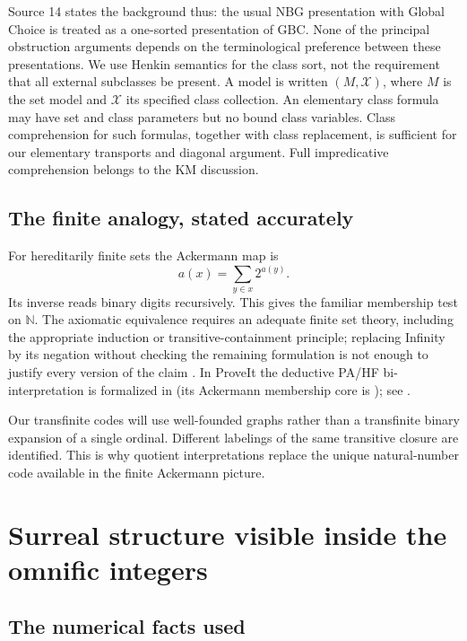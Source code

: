 \documentclass[11pt,letterpaper]{article}
\theoremstyle{definition}
\theoremstyle{remark}
\newcommand{\N}{\mathbb N}
\newcommand{\GBC}{\mathrm{GBC}}
\begin{document}
Source 14 states the background thus: the usual NBG presentation with Global
Choice is treated as a one-sorted presentation of $\GBC$. None of the principal
obstruction arguments depends on the terminological preference between these
presentations. We use Henkin semantics for the class sort, not the requirement
that all external subclasses be present. A model is written $(M,\mathcal X)$,
where $M$ is the set model and $\mathcal X$ its specified class collection. An
elementary class formula may have set and class parameters but no bound class
variables. Class comprehension for such formulas, together with class
replacement, is sufficient for our elementary transports and diagonal argument.
Full impredicative comprehension belongs to the KM discussion.

\subsection{The finite analogy, stated accurately}

For hereditarily finite sets the Ackermann map is
\[
 a(x)=\sum_{y\in x}2^{a(y)}.
\]
Its inverse reads binary digits recursively. This gives the familiar membership
test on $\N$. The axiomatic equivalence requires an adequate finite set theory,
including the appropriate induction or transitive-containment principle;
replacing Infinity by its negation without checking the remaining formulation is
not enough to justify every version of the claim \cite{KayeWong}. In ProveIt the
deductive PA/HF bi-interpretation is formalized in 
(its Ackermann membership core is ); see
.

Our transfinite codes will use well-founded graphs rather than a transfinite
binary expansion of a single ordinal. Different labelings of the same transitive
closure are identified. This is why quotient interpretations replace the unique
natural-number code available in the finite Ackermann picture.

\section{Surreal structure visible inside the omnific integers}
\label{hset:sf:sec:bits}

\subsection{The numerical facts used}
\end{document}
